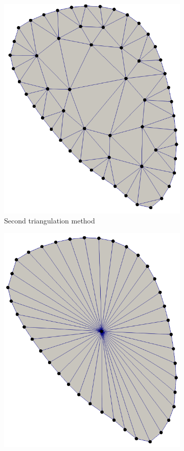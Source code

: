 \begin{figure}
\begin{subfigure}[t]{0.31\textwidth}
    \includegraphics[width=\textwidth]{images/fiber_creation/triangulation_1.png}%
    \caption{Second trian\-gulation method}%
    \label{fig:triangulation_1}%
  \end{subfigure}
  \quad
  \begin{subfigure}[t]{0.31\textwidth}%
    \centering%
    \includegraphics[width=\textwidth]{images/fiber_creation/triangulation_2.png}%

\end{subfigure}
\end{figure}
